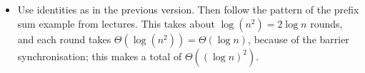 \begin{answer}
\begin{enumerate}
\begin{itemize}
\item
Use identities as in the previous version.  Then follow the pattern of the
prefix sum example from lectures.  This takes about $\log(n^2) = 2 \log n$
rounds, and each round takes $\Theta(\log(n^2)) = \Theta(\log n)$, because of
the barrier synchronisation; this makes a total of $\Theta((\log n)^2)$.
\end{itemize}




\end{enumerate}
\end{answer}
